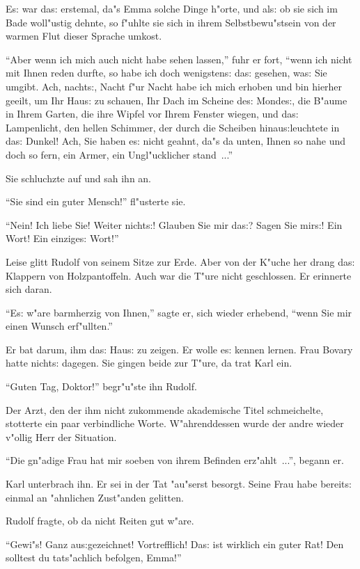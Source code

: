 \documentclass[oneside,12pt]{book}
\newcommand{\s}{s:}%
\begin{document}
E{\s} war da{\s} erstemal, da"s Emma solche Dinge h"orte, und
al{\s} ob sie sich im Bade woll"ustig dehnte, so f"uhlte sie sich
in ihrem Selbstbewu"stsein von der warmen Flut dieser Sprache
umkost.

"`Aber wenn ich mich auch nicht habe sehen lassen,"' fuhr er fort,
"`wenn ich nicht mit Ihnen reden durfte, so habe ich doch
wenigsten{\s} da{\s} gesehen, wa{\s} Sie umgibt. Ach, nacht{\s},
Nacht f"ur Nacht habe ich mich erhoben und bin hierher geeilt, um
Ihr Hau{\s} zu schauen, Ihr Dach im Scheine de{\s} Monde{\s}, die
B"aume in Ihrem Garten, die ihre Wipfel vor Ihrem Fenster wiegen,
und da{\s} Lampenlicht, den hellen Schimmer, der durch die
Scheiben hinau{\s}leuchtete in da{\s} Dunkel! Ach, Sie haben e{\s}
nicht geahnt, da"s da unten, Ihnen so nahe und doch so fern, ein
Armer, ein Ungl"ucklicher stand~..."'

Sie schluchzte auf und sah ihn an.

"`Sie sind ein guter Mensch!"' fl"usterte sie.

"`Nein! Ich liebe Sie! Weiter nicht{\s}! Glauben Sie mir da{\s}?
Sagen Sie mir{\s}! Ein Wort! Ein einzige{\s} Wort!"'

Leise glitt Rudolf von seinem Sitze zur Erde. Aber von der K"uche
her drang da{\s} Klappern von Holzpantoffeln. Auch war die T"ure
nicht geschlossen. Er erinnerte sich daran.

"`E{\s} w"are barmherzig von Ihnen,"' sagte er, sich wieder
erhebend, "`wenn Sie mir einen Wunsch erf"ullten."'

Er bat darum, ihm da{\s} Hau{\s} zu zeigen. Er wolle e{\s} kennen
lernen. Frau Bovary hatte nicht{\s} dagegen. Sie gingen beide zur
T"ure, da trat Karl ein.

"`Guten Tag, Doktor!"' begr"u"ste ihn Rudolf.

Der Arzt, den der ihm nicht zukommende akademische Titel
schmeichelte, stotterte ein paar verbindliche Worte.
W"ahrenddessen wurde der andre wieder v"ollig Herr der Situation.

"`Die gn"adige Frau hat mir soeben von ihrem Befinden erz"ahlt~..."',
begann er.

Karl unterbrach ihn. Er sei in der Tat "au"serst besorgt. Seine
Frau habe bereit{\s} einmal an "ahnlichen Zust"anden gelitten.

Rudolf fragte, ob da nicht Reiten gut w"are.

"`Gewi"s! Ganz au{\s}gezeichnet! Vortrefflich! Da{\s} ist wirklich
ein guter Rat! Den solltest du tats"achlich befolgen, Emma!"'
\end{document}
